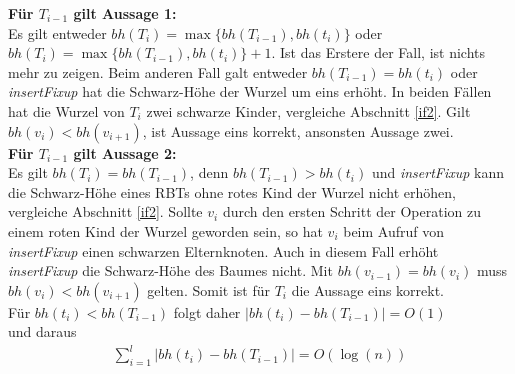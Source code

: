 \documentclass[a4paper,12pt]{article}
\begin{document}
\noindent \textbf{Für $T_{i-1}$ gilt Aussage 1:}\\
Es gilt entweder $\mathit{bh} \left(T_{i} \right) = \max\{\mathit{bh} \left(T_{i-1}\right), \mathit{bh} \left(t_{i} \right) \} $  oder \\ $\mathit{bh} \left(T_{i} \right) = \max\{\mathit{bh} \left(T_{i-1}\right), \mathit{bh} \left(t_{i} \right) \} + 1$. Ist das Erstere der Fall, ist nichts mehr zu zeigen. Beim anderen Fall galt entweder  $\mathit{bh} \left(T_{i-1} \right) =  \mathit{bh} \left(t_{i} \right)$ oder \\ \textit{insertFixup} hat die Schwarz-Höhe der Wurzel um eins erhöht. In beiden Fällen hat die Wurzel von $T_i$ zwei schwarze Kinder, vergleiche Abschnitt \ref{if2}. Gilt  $\mathit{bh} \left(v_{i} \right) < \mathit{bh} \left(v_{i+1} \right)$, ist Aussage eins korrekt, ansonsten Aussage zwei.\\

\noindent \textbf{Für $T_{i-1}$ gilt Aussage 2:}\\
 Es gilt $\mathit{bh} \left(T_{i} \right) = \mathit{bh} \left(T_{i-1} \right)$, denn $\mathit{bh} \left(T_{i-1} \right) > \mathit{bh} \left(t_{i} \right)$ und \textit{insertFixup} kann die Schwarz-Höhe eines RBTs  ohne rotes Kind der Wurzel nicht erhöhen, vergleiche Abschnitt \ref{if2}. Sollte $v_i$ durch den ersten Schritt der Operation zu einem roten Kind der Wurzel geworden sein, so hat $v_i$ beim Aufruf von \textit{insertFixup} einen schwarzen Elternknoten. Auch in diesem Fall erhöht \mbox{\textit{insertFixup}} die Schwarz-Höhe des Baumes nicht. Mit  $\mathit{bh} \left(v_{i-1} \right) = \mathit{bh} \left(v_{i} \right)$ muss  $\mathit{bh} \left(v_{i} \right) < \mathit{bh} \left(v_{i+1} \right)$ gelten. Somit ist für $T_i$ die Aussage eins korrekt.\\

 

\noindent Für $\mathit{bh} \left(t_{i} \right) < \mathit{bh} \left(T_{i-1} \right)$ folgt daher  $\vert\mathit{bh} \left(t_{i} \right) -\mathit{bh} \left(T_{i-1} \right) \vert = O\left(1\right) $ \\ und daraus
\begin{align*}
\sum_{i = 1}^{l} \vert\mathit{bh} \left(t_{i} \right) -\mathit{bh} \left(T_{i-1} \right) \vert =  O \left(\log \left(n \right) \right) 
\end{align*}
\end{document}
